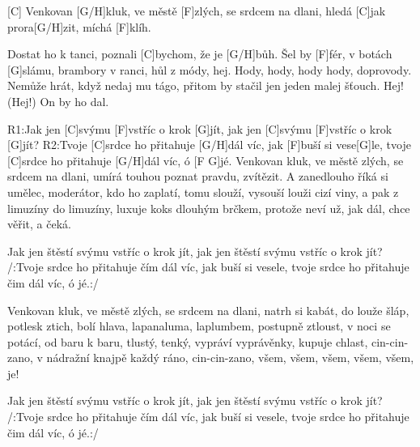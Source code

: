 
[C] Venkovan [G/H]kluk, ve městě [F]zlých,
se srdcem na dlani,
hledá [C] jak prora[G/H]zit,
míchá [F]klíh.

Dostat ho k tanci,
poznali [C]bychom, že je [G/H]bůh.
Šel by [F]fér, v botách [G]slámu,
brambory v ranci, hůl z módy, hej.
Hody, hody, hody hody, doprovody.
Nemůže hrát,
když nedaj mu tágo, přitom by stačil
jen jeden malej šťouch.
Hej! (Hej!)  On by ho dal. 

R1:Jak jen [C]svýmu [F]vstříc o krok [G]jít,
jak jen [C]svýmu [F]vstříc o krok [G]jít?
R2:Tvoje [C]srdce ho přitahuje [G/H] dál víc,
jak [F]buší si vese[G]le,
tvoje [C]srdce ho přitahuje [G/H] dál víc, ó [F G]jé.
\slpc
Venkovan kluk, ve městě zlých,
se srdcem na dlani,
umírá touhou poznat pravdu, zvítězit.
A zanedlouho říká si umělec, moderátor,
kdo ho zaplatí, tomu slouží,
vysouší louži cizí viny,
a pak z limuzíny do limuzíny,
luxuje koks dlouhým brčkem,
protože neví už, jak dál,
chce věřit, a čeká.

Jak jen štěstí svýmu vstříc o krok jít,
jak jen štěstí svýmu vstříc o krok jít?
/:Tvoje srdce ho přitahuje čím dál víc,
jak buší si vesele,
tvoje srdce ho přitahuje čim dál víc, ó jé.:/

Venkovan kluk, ve městě zlých,
se srdcem na dlani,
natrh si kabát, do louže šláp,
potlesk ztich, bolí hlava,
lapanaluma, laplumbem,
postupně ztloust, v noci se potácí,
od baru k baru, tlustý, tenký,
vypráví vyprávěnky, kupuje chlast,
cin-cin-zano, v nádražní knajpě
každý ráno, cin-cin-zano,
všem, všem, všem, všem, všem, je!

Jak jen štěstí svýmu vstříc o krok jít,
jak jen štěstí svýmu vstříc o krok jít?
/:Tvoje srdce ho přitahuje čím dál víc,
jak buší si vesele,
tvoje srdce ho přitahuje čim dál víc, ó jé.:/
